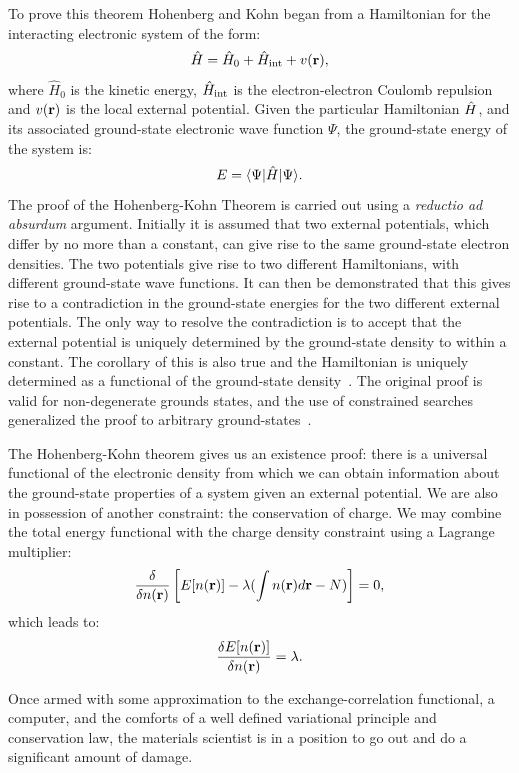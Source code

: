 To prove this theorem Hohenberg and Kohn began 
from a Hamiltonian for the interacting electronic system of the form:
%
\begin{equation}
\hat{H} = \hat{H}_{0} + \hat{H}_{\rm{int}} + v({\bf r}),
\end{equation}
%
where $\hat{H}_{0}$ is the kinetic energy, $\hat{H}_{\rm{int}}$ is the electron-electron Coulomb repulsion
and $v({\bf r})$ is the local external potential. Given the particular Hamiltonian $\hat{H}$, and its associated
ground-state electronic wave function $\Psi$, the ground-state energy of the system is: 
%
\begin{equation}
E = \langle \Psi | \hat{H} | \Psi \rangle.
\end{equation}
%
The proof of the Hohenberg-Kohn Theorem is carried out using a \textit{reductio ad absurdum} 
argument. Initially it is assumed that two external potentials, which differ by no more than
a constant, can give rise to the same ground-state electron densities. The two potentials
give rise to two different Hamiltonians, with different ground-state wave functions. It
can then be demonstrated that this gives rise to a contradiction in the ground-state
energies for the two different external potentials. The only way to resolve the contradiction
is to accept that the external potential is uniquely determined by the ground-state density to 
within a constant. The corollary of this is also true and the Hamiltonian is uniquely determined
as a functional of the ground-state density~\cite{martin}. 
The original proof is valid for non-degenerate grounds states, 
and the use of constrained searches generalized the proof
to arbitrary ground-states~\cite{levy79, levy82, lieb83}.

The Hohenberg-Kohn theorem gives us an existence proof:
there is a universal functional of the electronic density
from which we can obtain information about the ground-state properties
of a system given an external potential.
We are also in possession of another constraint: the conservation of charge.
We may combine the total energy functional with 
the charge density constraint using a Lagrange multiplier:
%
\begin{equation}
\frac{\delta}{\delta n({\bf r})} \left[E[n({\bf r})] - \lambda(\int n({\bf r})d{\bf r} - N)\right] = 0,
\end{equation}
%
which leads to:
%
\begin{equation}
\frac{\delta E[n({\bf r})]}{\delta n({\bf r})}= \lambda.
\end{equation}

Once armed with some approximation to the exchange-correlation functional, a computer, 
and the comforts of a well defined variational principle and conservation law,
the materials scientist is in a position to go out and do a significant amount of damage. 

